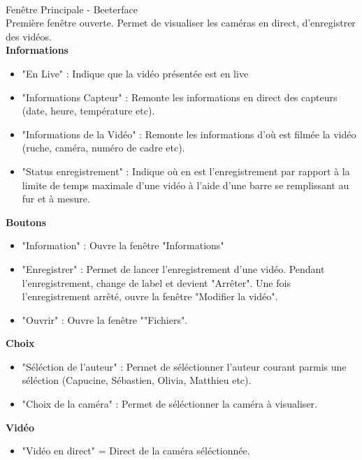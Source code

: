 \documentclass[11pt,french,a4paper]{report}
\begin{document}
    \begin{multicols}{2}
        \begin{small} 
\dotfill \\

\Large Fenêtre Principale - Beeterface \normalsize \\
    Première fenêtre ouverte. Permet de visualiser les caméras en direct, d'enregistrer
    des vidéos. \\
            \large \textbf{Informations} \normalsize
     \begin{itemize}[label=, leftmargin=*,parsep=0cm,itemsep=0cm,topsep=0cm]
        \item "En Live" : Indique que la vidéo présentée est en live
        \item "Informations Capteur" : Remonte les informations en direct des capteurs (date, heure, température etc).
        \item "Informations de la Vidéo" : Remonte les informations d'où est filmée la vidéo (ruche, caméra, numéro de cadre etc).
        \item "Status enregistrement" : Indique où en est l'enregistrement par rapport à la limite de temps maximale d'une vidéo à
               l'aide d'une barre se remplissant au fur et à mesure.
    \end{itemize}
            \large \textbf{Boutons} \normalsize
     \begin{itemize}[label=, leftmargin=*,parsep=0cm,itemsep=0cm,topsep=0cm]
        \item "Information" : Ouvre la fenêtre "Informations"
        \item "Enregistrer" : Permet de lancer l'enregistrement d'une vidéo. Pendant l'enregistrement, change de label et
        devient "Arrêter". Une fois l'enregistrement arrêté, ouvre la fenêtre "Modifier la vidéo".
        \item "Ouvrir" : Ouvre la fenêtre ""Fichiers".
    \end{itemize}
            \large \textbf{Choix} \normalsize
     \begin{itemize}[label=, leftmargin=*,parsep=0cm,itemsep=0cm,topsep=0cm]
        \item "Séléction de l'auteur" : Permet de séléctionner l'auteur courant parmis une séléction (Capucine, Sébastien, Olivia, Matthieu etc).
        \item "Choix de la caméra" : Permet de séléctionner la caméra à visualiser.
    \end{itemize}
            \large \textbf{Vidéo} \normalsize
     \begin{itemize}[label=, leftmargin=*,parsep=0cm,itemsep=0cm,topsep=0cm]
        \item "Vidéo en direct" = Direct de la caméra séléctionnée.
    \end{itemize}


\end{small}
\end{multicols}
\end{document}
